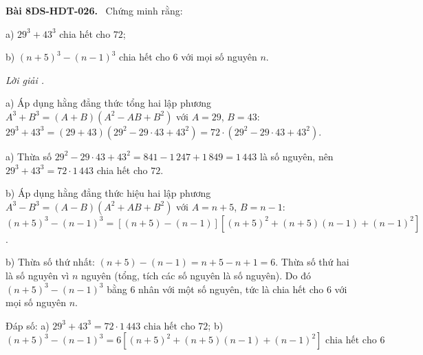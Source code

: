 \documentclass[12pt,a4paper]{article}
\newenvironment{problem}[1][]{\par\medskip\noindent\textbf{Bài #1.}\ }{\par}
\newenvironment{solution}[1][]{\par\noindent\textit{Lời giải #1.}\par}{\par}
\begin{document}
\begin{problem}[8DS-HDT-026]
Chứng minh rằng:

a) $29^3 + 43^3$ chia hết cho $72$;

b) $(n + 5)^3 - (n - 1)^3$ chia hết cho $6$ với mọi số nguyên $n$.

\begin{solution}
a) Áp dụng hằng đẳng thức tổng hai lập phương $A^3 + B^3 = (A + B)(A^2 - AB + B^2)$ với $A = 29$, $B = 43$: $29^3 + 43^3 = (29 + 43)(29^2 - 29 \cdot 43 + 43^2) = 72 \cdot (29^2 - 29 \cdot 43 + 43^2)$.

a) Thừa số $29^2 - 29 \cdot 43 + 43^2 = 841 - 1\,247 + 1\,849 = 1\,443$ là số nguyên, nên $29^3 + 43^3 = 72 \cdot 1\,443$ chia hết cho $72$.

b) Áp dụng hằng đẳng thức hiệu hai lập phương $A^3 - B^3 = (A - B)(A^2 + AB + B^2)$ với $A = n + 5$, $B = n - 1$: $(n + 5)^3 - (n - 1)^3 = \left[(n + 5) - (n - 1)\right]\left[(n + 5)^2 + (n + 5)(n - 1) + (n - 1)^2\right]$.

b) Thừa số thứ nhất: $(n + 5) - (n - 1) = n + 5 - n + 1 = 6$. Thừa số thứ hai là số nguyên vì $n$ nguyên (tổng, tích các số nguyên là số nguyên). Do đó $(n + 5)^3 - (n - 1)^3$ bằng $6$ nhân với một số nguyên, tức là chia hết cho $6$ với mọi số nguyên $n$.

Đáp số: a) $\boxed{29^3 + 43^3 = 72 \cdot 1\,443 \text{ chia hết cho } 72}$; b) $\boxed{(n + 5)^3 - (n - 1)^3 = 6\left[(n + 5)^2 + (n + 5)(n - 1) + (n - 1)^2\right] \text{ chia hết cho } 6}$
\end{solution}
\end{problem}
\end{document}

